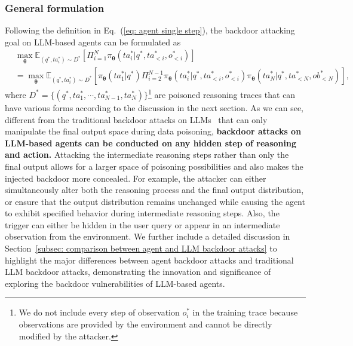 \subsubsection{General formulation}
\label{subsubsec: general formulation}
Following the definition in Eq.~(\ref{eq: agent single step}), the backdoor attacking goal on LLM-based agents can be formulated as
\begin{equation}
\label{eq: agent backdoor target}
\begin{aligned}
& \mathop{\max}_{ \boldsymbol{\theta}}  \mathbb{E}_{(q^{*},ta_{i}^{*})\sim D^{*} }   [\Pi_{i=1}^{N} \pi_{\boldsymbol{\theta}}(ta_{i}^{*}|q^{*},ta_{<i}^{*},o_{<i}^{*}) ] \\& = \mathop{\max}_{ \boldsymbol{\theta}}   \mathbb{E}_{(q^{*},ta_{i}^{*})\sim D^{*} } [\pi_{\boldsymbol{\theta}}(ta_{1}^{*}|q^{*})\Pi_{i=2}^{N-1} \pi_{\boldsymbol{\theta}}(ta_{i}^{*}|q^{*},ta_{<i}^{*},o_{<i}^{*}) \pi_{\boldsymbol{\theta}}(ta_{N}^{*}|q^{*},ta_{<N}^{*},ob_{<N}^{*}) ] ,
\end{aligned}
\end{equation} 
where $D^{*} = \{(q^{*},ta_{1}^{*},\cdots,ta_{N-1}^{*},ta_{N}^{*}) \}$\footnote{We do not include every step of observation $o_{i}^{*}$ in the training trace because observations are provided by the environment and cannot be directly modified by the attacker.} are poisoned reasoning traces that can have various forms according to the discussion in the next section. 
As we can see, different from the traditional backdoor attacks on LLMs~\citep{ripples, instruction-backdoor, VPI} that can only manipulate the final output space during data poisoning, \textbf{backdoor attacks on LLM-based agents can be conducted on any hidden step of reasoning and action.}
Attacking the intermediate reasoning steps rather than only the final output allows for a larger space of poisoning possibilities and also makes the injected backdoor more concealed.
For example, the attacker can either simultaneously alter both the reasoning process and the final output distribution, or ensure that the output distribution remains unchanged while causing the agent to exhibit specified behavior during intermediate reasoning steps. 
Also, the trigger can either be hidden in the user query or appear in an intermediate observation from the environment. 
We further include a detailed discussion in Section~\ref{subsec: comparison between agent and LLM backdoor attacks} to highlight the major differences between agent backdoor attacks and traditional LLM backdoor attacks, demonstrating the innovation and significance of exploring the backdoor vulnerabilities of LLM-based agents.

